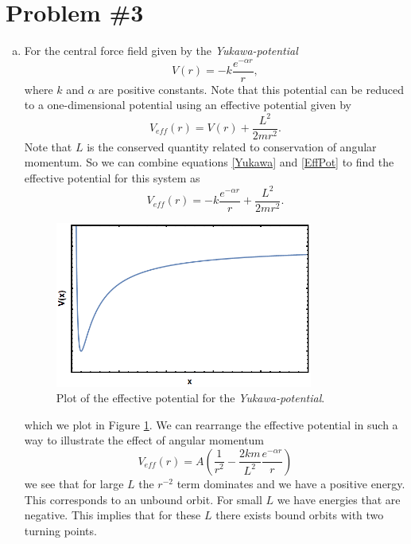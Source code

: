 \documentclass[11pt]{article}
\numberwithin{equation}{section}
\begin{document}
\pagebreak

\section{Problem \#3}
\begin{enumerate}[(a)]
\item For the central force field given by the \emph{Yukawa-potential}
\begin{equation}
V(r) = -k\frac{e^{-\alpha r}}{r},
\label{Yukawa}
\end{equation}
where $k$ and $\alpha$ are positive constants. Note that this potential can be reduced to a
one-dimensional potential using an effective potential given by
\begin{equation}
V_{eff}(r) = V(r) + \frac{L^2}{2mr^2}.
\label{EffPot}
\end{equation}
Note that $L$ is the conserved quantity related to conservation of angular momentum. So we 
can combine equations \ref{Yukawa} and \ref{EffPot} to find the effective potential for this
system as
$$V_{eff}(r) = -k\frac{e^{-\alpha r}}{r} + \frac{L^2}{2mr^2}.$$
\begin{figure}
\centering
\includegraphics[width=0.8\textwidth,keepaspectratio]{Images/Problem3a.png}
\caption{Plot of the effective potential for the \emph{Yukawa-potential}.}
\label{Prob3a}
\end{figure}
which we plot in Figure \ref{Prob3a}. We can rearrange the effective potential in such a way
to illustrate the effect of angular momentum
$$V_{eff}(r) = A\left(\frac{1}{r^2} - \frac{2km}{L^2}\frac{e^{-\alpha r}}{r}\right)$$
we see that for large $L$ the $r^{-2}$ term dominates and we have a positive energy. This 
corresponds to an unbound orbit. For small $L$ we have energies that are negative. This 
implies that for these $L$ there exists bound orbits with two turning points.


\end{enumerate}
\end{document}
